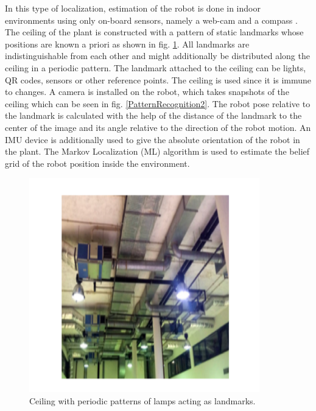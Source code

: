 In this type of localization, estimation of the robot is done in indoor environments using
only on-board sensors, namely a web-cam and a compass \cite{pat_recog}. The ceiling of the plant is constructed with a pattern of static landmarks whose positions are known a priori as shown in fig. \ref{Pattern Recognition}. All landmarks are indistinguishable from each other and might additionally be distributed along the ceiling in a periodic pattern. The landmark attached to the ceiling can be lights, QR codes, sensors or other reference points. The ceiling is used since it is immune to changes. A camera is installed on the robot, which takes snapshots of the ceiling which can be seen in fig. \ref{PatternRecognition2}. The robot pose relative to the landmark is calculated with the help of the distance of the landmark to the center of the image and its angle relative to the direction of the robot motion. An IMU device is additionally used to give the absolute orientation of the robot in the plant. The Markov Localization (ML) algorithm is used to estimate
the belief grid of the robot position inside the environment. 

\begin{figure}[!htbp]
	\centering
	\includegraphics[width = 10cm]{Pictures/PR.png}
	\caption{Ceiling with periodic patterns of lamps acting as landmarks. }
	\label{Pattern Recognition}
\end{figure}
